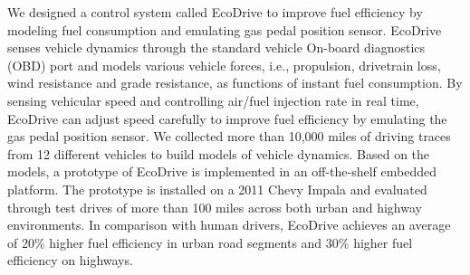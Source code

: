 We designed a control system called EcoDrive to improve fuel efficiency
by modeling fuel consumption and emulating gas pedal position sensor. 
EcoDrive senses vehicle dynamics through
the standard vehicle On-board diagnostics (OBD) port and 
models various vehicle forces, i.e., 
propulsion, drivetrain loss, wind resistance and grade resistance, 
as functions of instant fuel consumption. 
By sensing vehicular speed and controlling air/fuel injection rate in real time, 
EcoDrive can adjust speed carefully to improve fuel efficiency by
emulating the gas pedal position sensor. 
We collected more than 10,000 miles of driving traces from 12 different vehicles
to build models of vehicle dynamics. 
Based on the models, a prototype of EcoDrive is implemented in an off-the-shelf 
embedded platform. 
The prototype is installed on a 2011 Chevy Impala and 
evaluated through test drives of more than 100 miles across both
urban and highway environments. 
In comparison with human drivers, 
EcoDrive achieves an average of 20\% higher fuel efficiency in urban road segments 
and 30\% higher fuel efficiency on highways. 






